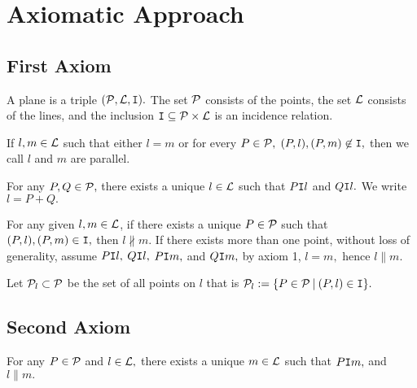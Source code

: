 


\maketitle

\chapter{Axiomatic Approach}

\section{First Axiom}

\begin{definition}
    A plane is a triple $(\mathcal{P},\mathcal{L},\texttt{I}).$ The set $\mathcal{P}$ consists of the points, the set $\mathcal{L}$ consists of the lines, and the inclusion $\texttt{I} \subseteq \mathcal{P} \times \mathcal{L}$ is an incidence relation. 
\end{definition}

\begin{definition}
    If $l,m \in \mathcal{L}$ such that either $l = m$ or for every $P \in \mathcal{P},$ $(P,l),(P,m) \not \in \texttt{I},$ then we call $l$ and $m$ are parallel.
\end{definition}

\begin{axiom}[1]
    For any $P,Q \in \mathcal{P},$ there exists a unique $l \in \mathcal{L}$ such that $P \texttt{I} l$ and $Q \texttt{I} l.$ We write $l=P+Q.$
\end{axiom}

For any given $l,m \in \mathcal{L}$, if there exists a unique $P \in \mathcal{P}$ such that $(P,l),(P,m) \in \texttt{I},$ then $l \nparallel m$. If there exists more than one point, without loss of generality, assume $P \texttt{I} l,$ $Q \texttt{I} l,$ $P \texttt{I} m,$ and $Q \texttt{I} m,$ by axiom 1, $l=m,$ hence $l \parallel m.$

Let $\mathcal{P}_l \subset \mathcal{P}$ be the set of all points on $l$ that is $\mathcal{P}_l := \{ P \in \mathcal{P} \: | \: (P,l) \in \texttt{I}\}.$

\section{Second Axiom}

\begin{axiom}[2]
    For any $P \in \mathcal{P}$ and $l \in \mathcal{L},$ there exists a unique $m \in \mathcal{L}$ such that $P \texttt{I} m,$ and $l \parallel m.$
\end{axiom}

